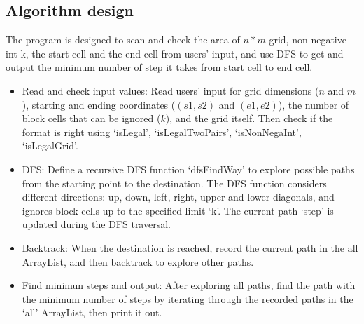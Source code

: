 \documentclass{article}
\begin{document}
\subsection{Algorithm design}
The program is designed to scan and check the area of $n*m$ grid, non-negative int k, the start cell and the end cell from users' input, and use DFS to get and output the minimum number of step it takes from start cell to end cell.\\
\begin{itemize}
\item Read and check input values: Read users' input for grid dimensions ($n$ and $m$), starting and ending coordinates ($(s1, s2)$ and $(e1, e2)$), the number of block cells that can be ignored ($k$), and the grid itself. Then check if the format is right using `isLegal', `isLegalTwoPairs', `isNonNegaInt', `isLegalGrid'.
\item DFS: Define a recursive DFS function `dfsFindWay' to explore possible paths from the starting point to the destination. The DFS function considers different directions: up, down, left, right, upper and lower diagonals, and ignores block cells up to the specified limit `k'. The current path `step' is updated during the DFS traversal.
\item Backtrack: When the destination is reached, record the current path in the all ArrayList, and then backtrack to explore other paths.
\item Find minimun steps and output: After exploring all paths, find the path with the minimum number of steps by iterating through the recorded paths in the `all' ArrayList, then print it out.
\end{itemize}
\end{document}

